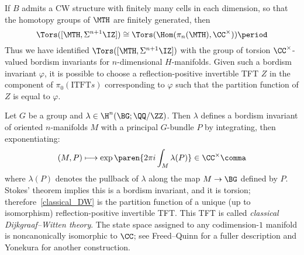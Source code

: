If $B$ admits a CW structure with finitely many cells in each dimension, so that the homotopy groups of $\MTH$ are
finitely generated, then
\begin{equation*}
	\Tors([\MTH, \Sigma^{n+1}\IZ])\cong \Tors(\Hom(\pi_n(\MTH),\CC^\times)) \period
\end{equation*}
Thus we have identified $\Tors([\MTH, \Sigma^{n+1}\IZ])$ with the group of torsion
$\CC^\times$-valued bordism invariants for $n$-dimensional $H$-manifolds.  Given such a bordism invariant
$\varphi$, it is possible to choose a reflection-positive invertible TFT $Z$ in the component of
$\pi_0(\mathrm{ITFT}s)$ corresponding to $\varphi$ such that the partition function of $Z$ is equal to $\varphi$.

\begin{example}
	\label{classical_DW}
	Let $G$ be a group and $\lambda\in \H^n(\BG;\QQ/\ZZ)$. Then $\lambda$ defines a bordism invariant of oriented
	$n$-manifolds $M$ with a principal $G$-bundle $P$ by integrating, then exponentiating:
	\begin{equation}
		(M, P)\longmapsto \exp\paren{2\pi i \int_M \lambda(P)}\in\CC^\times\comma
	\end{equation}
	where $\lambda(P)$ denotes the pullback of $\lambda$ along the map $M\to \BG$ defined by $P$. Stokes' theorem
	implies this is a bordism invariant, and it is torsion; therefore~\eqref{classical_DW} is the partition
	function of a unique (up to isomorphism) reflection-positive invertible TFT. This TFT is called
	\textit{classical Dijkgraaf--Witten theory}. The state space assigned to any codimension-$1$ manifold is
	noncanonically isomorphic to $\CC$; see Freed--Quinn \cite[\S 1]{FQ93} for a fuller description and
	Yonekura \cite[\S 4]{Yon19} for another construction.
\end{example}

